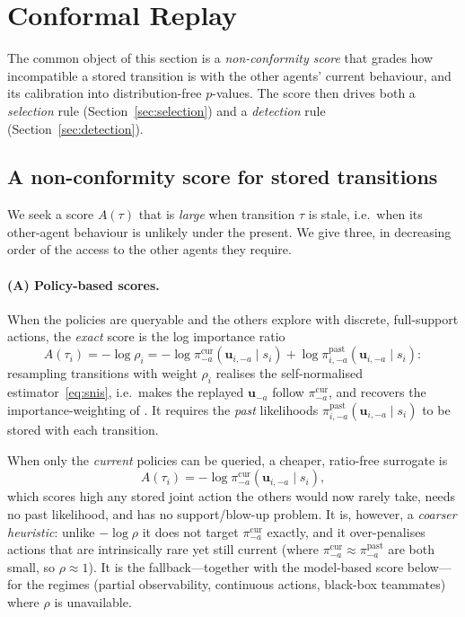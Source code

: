 \documentclass[sigconf]{aamas}
\newcommand{\uma}{\mathbf{u}_{-a}}
\newcommand{\umai}{\mathbf{u}_{i,-a}}
\newcommand{\picur}{\pi^{\mathrm{cur}}_{-a}}
\newcommand{\pipast}{\pi^{\mathrm{past}}_{-a}}
\newcommand{\pipasti}{\pi^{\mathrm{past}}_{i,-a}}
\begin{document}
\section{Conformal Replay}
\label{sec:method}

The common object of this section is a \emph{non-conformity score} that grades how
incompatible a stored transition is with the other agents' current behaviour, and
its calibration into distribution-free $p$-values. The score then drives both a
\emph{selection} rule (Section~\ref{sec:selection}) and a \emph{detection} rule
(Section~\ref{sec:detection}).

\subsection{A non-conformity score for stored transitions}
\label{sec:score}
We seek a score $A(\tau)$ that is \emph{large} when transition $\tau$ is stale,
i.e.\ when its other-agent behaviour is unlikely under the present. We give
three, in decreasing order of the access to the other agents they require.

\paragraph{(A) Policy-based scores.} When the policies are queryable and the
others explore with discrete, full-support actions, the \emph{exact} score is the
log importance ratio
\begin{equation}
\label{eq:score-ratio}
A(\tau_i)=-\log\rho_i=-\log\picur(\umai\mid s_i)+\log\pipasti(\umai\mid s_i):
\end{equation}
resampling transitions with weight $\rho_i$ realises the self-normalised
estimator~\eqref{eq:snis}, i.e.\ makes the replayed $\uma$ follow $\picur$, and
recovers the importance-weighting of \citet{foerster2017stabilising}. It requires
the \emph{past} likelihoods $\pipasti(\umai\mid s_i)$ to be stored with each
transition.

When only the \emph{current} policies can be queried, a cheaper, ratio-free
surrogate is
\begin{equation}
\label{eq:score-policy}
A(\tau_i)=-\log\picur(\umai\mid s_i),
\end{equation}
which scores high any stored joint action the others would now rarely take, needs
no past likelihood, and has no support/blow-up problem. It is, however, a
\emph{coarser heuristic}: unlike $-\log\rho$ it does not target $\picur$ exactly,
and it over-penalises actions that are intrinsically rare yet still current
(where $\picur\approx\pipast$ are both small, so $\rho\approx1$). It is the
fallback---together with the model-based score below---for the regimes (partial
observability, continuous actions, black-box teammates) where $\rho$ is
unavailable.
\end{document}
